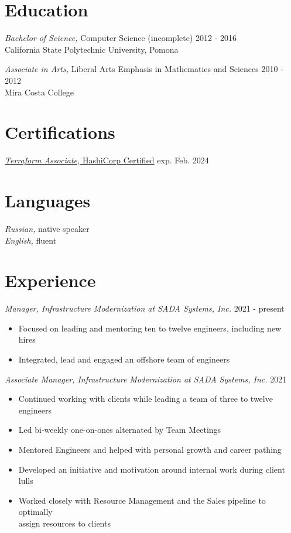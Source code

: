 \documentclass[line]{docs/resume/res}
\begin{document}
\address{https://slava.lol}
\address{Email: me@slava.lol}

\begin{resume}

\section{Education}
  {\sl Bachelor of Science,} Computer Science (incomplete) \hfill 2012 - 2016 \\
  California State Polytechnic University, Pomona

  {\sl Associate in Arts,} Liberal Arts Emphasis in Mathematics and Sciences \hfill 2010 - 2012 \\
  Mira Costa College

\section{Certifications}
  \href{https://www.credly.com/earner/earned/badge/7b236fee-2866-4ca1-9da4-7600f851212c}{{\sl Terraform Associate,} HashiCorp Certified} \hfill exp. Feb. 2024

\section{Languages}
  {\sl Russian,} native speaker \\
  {\sl English,} fluent

\section{Experience}
  {\sl Manager, Infrastructure Modernization at SADA Systems, Inc.} \hfill 2021 - present
  \begin{itemize} \itemsep -2pt
    \item Focused on leading and mentoring ten to twelve engineers, including new hires
    \item Integrated, lead and engaged an offshore team of engineers
  \end{itemize}

  {\sl Associate Manager, Infrastructure Modernization at SADA Systems, Inc.} \hfill 2021
  \begin{itemize} \itemsep -2pt
    \item Continued working with clients while leading a team of three to twelve engineers
    \item Led bi-weekly one-on-ones alternated by Team Meetings
    \item Mentored Engineers and helped with personal growth and career pathing
    \item Developed an initiative and motivation around internal work during client lulls
    \item Worked closely with Resource Management and the Sales pipeline to optimally \\
      assign resources to clients
  \end{itemize}


\end{resume}
\end{document}
